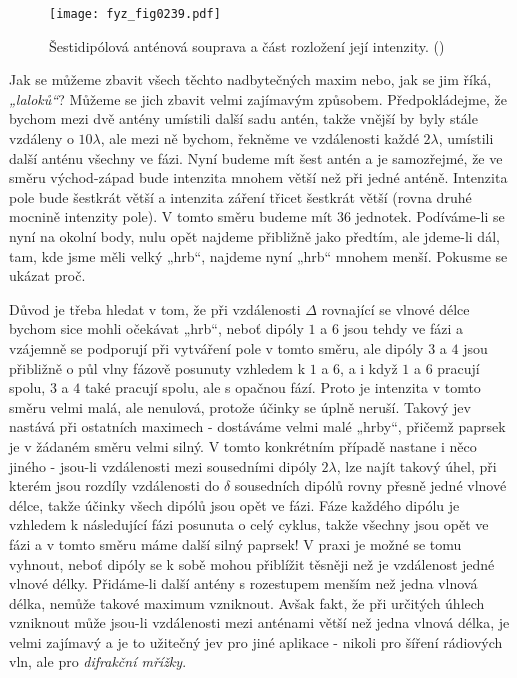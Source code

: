    \begin{figure}[ht!] %
      \centering
      \texttt{[image: fyz\_fig0239.pdf]}
      \caption{Šestidipólová anténová souprava a část rozložení její intenzity. 
               (\cite[s.~385]{Feynman01})}
      \label{fyz:fig0239}
    \end{figure}
    
    Jak se můžeme zbavit všech těchto nadbytečných maxim nebo, jak se jim říká, \emph{„laloků“}? 
    Můžeme se jich zbavit velmi zajímavým způsobem. Předpokládejme, že bychom mezi dvě antény 
    umístili další sadu antén, takže vnější by byly stále vzdáleny o \(10\lambda\), ale mezi ně 
    bychom, řekněme ve vzdálenosti každé \(2\lambda\), umístili další anténu všechny ve fázi. Nyní 
    budeme mít šest antén a je samozřejmé, že ve směru východ-západ bude intenzita mnohem větší než 
    při jedné anténě. Intenzita pole bude šestkrát větší a intenzita záření třicet šestkrát větší 
    (rovna druhé mocnině intenzity pole). V tomto směru budeme mít \(36\) jednotek. Podíváme-li se 
    nyní na okolní body, nulu opět najdeme přibližně jako předtím, ale jdeme-li dál, tam, kde jsme 
    měli velký „hrb“, najdeme nyní „hrb“ mnohem menší. Pokusme se ukázat proč.
    
    Důvod je třeba hledat v tom, že při vzdálenosti \(\Delta\) rovnající se vlnové délce bychom 
    sice mohli očekávat „hrb“, neboť dipóly \(1\) a \(6\) jsou tehdy ve fázi a vzájemně se 
    podporují při vytváření pole v tomto směru, ale dipóly \(3\) a \(4\) jsou přibližně o půl vlny 
    fázově posunuty vzhledem k \(1\) a \(6\), a i když \(1\) a \(6\) pracují spolu, \(3\) a \(4\) 
    také pracují spolu, ale s opačnou fází. Proto je intenzita v tomto směru velmi malá, ale 
    nenulová, protože účinky se úplně neruší. Takový jev nastává při ostatních maximech - dostáváme 
    velmi malé „hrby“, přičemž paprsek je v žádaném směru velmi silný. V tomto konkrétním případě 
    nastane i něco jiného - jsou-li vzdálenosti mezi sousedními dipóly \(2\lambda\), lze najít 
    takový úhel, při kterém jsou rozdíly vzdálenosti do \(\delta\) sousedních dipólů rovny přesně 
    jedné vlnové délce, takže účinky všech dipólů jsou opět ve fázi. Fáze každého dipólu je 
    vzhledem k následující fázi posunuta o celý cyklus, takže všechny jsou opět ve fázi a v tomto 
    směru máme další silný paprsek! V praxi je možné se tomu vyhnout, neboť dipóly se k sobě mohou 
    přiblížit těsněji než je vzdálenost jedné vlnové délky. Přidáme-li další antény s rozestupem 
    menším než jedna vlnová délka, nemůže takové maximum vzniknout. Avšak fakt, že při určitých 
    úhlech vzniknout může jsou-li vzdálenosti mezi anténami větší než jedna vlnová délka, je velmi 
    zajímavý a je to užitečný jev pro jiné aplikace - nikoli pro šíření rádiových vln, ale pro 
    \emph{difrakční mřížky}.
    
